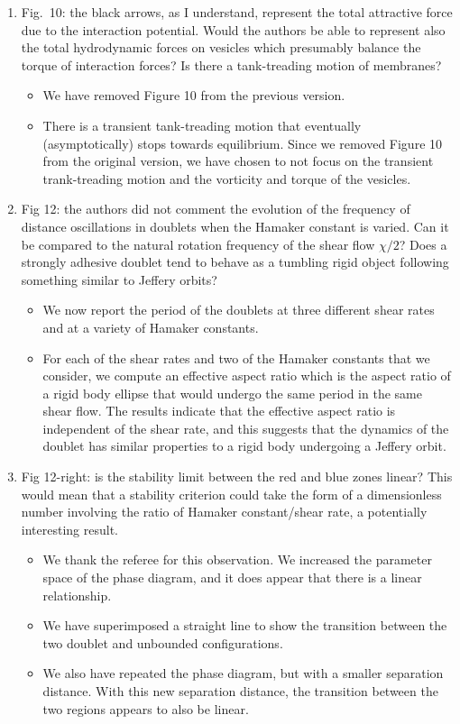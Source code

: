 \documentclass[11pt]{article}
\newcommand{\comment}[1]{{\color{blue} #1}}
\begin{document}
\begin{enumerate}
\item\comment{Fig.~10: the black arrows, as I understand, represent the total
attractive force due to the interaction potential. Would the authors
be able to represent also the total hydrodynamic forces on vesicles
which presumably balance the torque of interaction forces? Is there a
tank-treading motion of membranes?}
\begin{itemize}
  \item We have removed Figure 10 from the previous version.

  \item There is a transient tank-treading motion that eventually (asymptotically) stops towards equilibrium. 
  Since we removed Figure 10 from the original version, we have chosen to
    not focus on the transient trank-treading motion and the vorticity and torque of the vesicles.
\end{itemize}

\item\comment{Fig 12: the authors did not comment the evolution of the
frequency of distance oscillations in doublets when the Hamaker constant
is varied. Can it be compared to the natural rotation frequency of the
shear flow $\chi/2$? Does a strongly adhesive doublet tend to behave as
a tumbling rigid object following something similar to Jeffery orbits?}
\begin{itemize}
  \item We now report the period of the doublets at three different
    shear rates and at a variety of Hamaker constants.

  \item For each of the shear rates and two of the Hamaker constants
    that we consider, we compute an effective aspect ratio which is the
    aspect ratio of a rigid body ellipse that would undergo the same
    period in the same shear flow.  The results indicate that the
    effective aspect ratio is independent of the shear rate, and this
    suggests that the dynamics of the doublet has similar properties to
    a rigid body undergoing a Jeffery orbit. 
\end{itemize}

\item\comment{Fig 12-right: is the stability limit between the red and blue
zones linear? This would mean that a stability criterion could take
the form of a dimensionless number involving the ratio of Hamaker
constant/shear rate, a potentially interesting result.}
\begin{itemize}
  \item We thank the referee for this observation.  We increased the
    parameter space of the phase diagram, and it does appear that there
    is a linear relationship.
  \item We have superimposed a straight line to show the transition
    between the two doublet and unbounded configurations.
  \item We also have repeated the phase diagram, but with a smaller
    separation distance.  With this new separation distance, the
    transition between the two regions appears to also be linear.
\end{itemize}


\end{enumerate}
\end{document}
